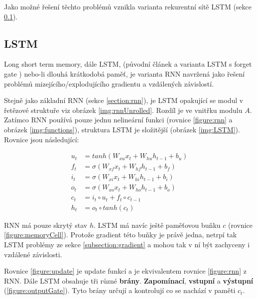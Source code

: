 Jako možné řešení těchto problémů vznikla varianta rekurentní sítě LSTM (sekce \ref{section:LSTM}).




\subsection{LSTM}\label{section:LSTM}
Long short term memory, dále LSTM, (původní článek \cite{LSTM} a varianta LSTM s forget gate \cite{forgetLSTM}) nebo-li dlouhá krátkodobá paměť, je varianta RNN navržená jako řešení problémů mizejícího/explodujícího gradientu a vzdálených závislostí.

Stejně jako základní RNN (sekce \ref{section:rnn}), je LSTM opakující se modul v řetězové struktuře viz obrázek \ref{img:rnnUnrolled}. Rozdíl je ve vnitřku modulu $A$. Zatímco RNN používá pouze jednu nelineární funkci (rovnice \ref{figure:rnn} a obrázek \ref{img:functions}), struktura LSTM je složitější (obrázek \ref{img:LSTM}). Rovnice jsou následující:

\begin{align}
    u_{t}&=tanh(W_{xu}x_t + W_{hu}h_{t-1} + b_u) \label{figure:update} \\
    f_{t}&=\sigma(W_{xf}x_{t}+W_{hf}h_{t-1}+b_{f}) \label{figure:forgetGate} \\
    i_{t}&=\sigma(W_{xi}x_{t}+W_{hi}h_{t-1}+b_{i}) \label{figure:inputGate} \\
    o_{t}&=\sigma(W_{xo}x_{t}+W_{ho}h_{t-1}+b_{o}) \label{figure:outputGate} \\
    c_{t}&=i_{t}\circ u_{t}+f_{t}\circ c_{t-1}\label{figure:memoryCell} \\
    h_{t}&=o_{t}\circ tanh(c_{t}) \label{figure:hiddenState}
\end{align}


RNN má pouze skrytý stav $h$. LSTM má navíc ještě paměťovou buňku $c$ (rovnice \ref{figure:memoryCell}). Protože gradient této buňky je právě jedna, netrpí tak LSTM problémy ze sekce \ref{subsection:gradient} a mohou tak v ní být zachyceny i vzdálené závislosti.

Rovnice \ref{figure:update} je update funkcí a je ekvivalentem rovnice \ref{figure:rnn} z RNN.
Dále LSTM obsahuje tři různé \textbf{brány}. \textbf{Zapomínací}, \textbf{vstupní} a \textbf{výstupní} (\ref{figure:outputGate}). Tyto brány určují a kontrolují co se nachází v paměti $c_t$.

